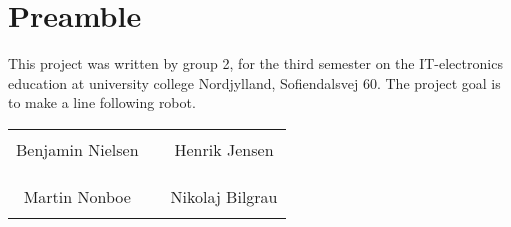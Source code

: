 \chapter*{Preamble}


This project was written by group 2, for the third semester on the IT-electronics education at university college Nordjylland, Sofiendalsvej 60. The project goal is to make a line following robot.
%
\phantom{Luft}\vspace{3cm}
\begin{table}[H]
	\centering
		\begin{tabular}{c c c}
			\underline{\phantom{JAERJAERJAERJAERGO}} & \phantom{cookies} & \underline{\phantom{JAERJAERJAERJAERGO}} \\
			Benjamin Nielsen			& \phantom{cookies} & Henrik Jensen		\\
			&&\\
			&&\\
			\underline{\phantom{JAERJAERJAERJAERGO}} & \phantom{cookies} & \underline{\phantom{JAERJAERJAERJAERGO}} \\
			Martin Nonboe			& \phantom{cookies} & Nikolaj Bilgrau		\\
			&&\\
						
		\end{tabular}
\end{table}